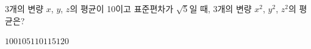 3개의 변량 $x$, $y$, $z$의 평균이 10이고 표준편차가 $\sqrt{5}$일 때, 3개의 변량 $x^2$, $y^2$, $z^2$의 평균은?
\begin{choices32}{$100$}{$105$}{$110$}{$115$}{$120$}\end{choices32}
